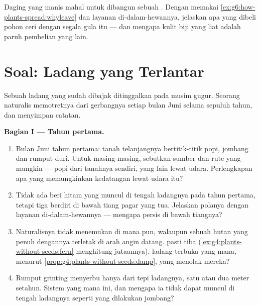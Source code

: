 \begin{exercise}[$\star\star\star$]\label{exo:g6:how-plants-spread:12}
Daging yang manis mahal untuk dibangun sebuah . Dengan memakai
\cref{ex:g6:how-plants-spread:whyleave} dan layanan di-dalam-hewannya,
jelaskan apa yang dibeli pohon ceri dengan segala gula itu --- dan
mengapa kulit biji yang liat adalah paruh pembelian yang lain.
\end{exercise}

\section{Soal: Ladang yang Terlantar}

\begin{problem}\label{pb:g6:how-plants-spread:1}
Sebuah ladang yang sudah dibajak ditinggalkan pada musim gugur. Seorang
naturalis memotretnya dari gerbangnya setiap bulan Juni selama sepuluh
tahun, dan menyimpan catatan.

\medskip\noindent\textbf{Bagian I --- Tahun pertama.}
\begin{enumerate}
  \item Bulan Juni tahun pertama: tanah telanjangnya bertitik-titik
         popi, jombang dan rumput duri. Untuk masing-masing,
        sebutkan sumber dan rute yang mungkin ---  popi dari
        tanahnya sendiri, yang lain lewat udara. Perlengkapan apa yang
        memungkinkan kedatangan lewat udara itu?
  \item Tidak ada beri hitam yang muncul di tengah ladangnya pada
        tahun pertama, tetapi tiga  berdiri di bawah tiang
        pagar yang tua. Jelaskan polanya dengan layanan
        di-dalam-hewannya --- mengapa persis di bawah tiangnya?
  \item Naturalisnya tidak menemukan  di mana pun,
        walaupun sebuah hutan yang penuh dengannya terletak di arah
        angin datang.   pasti tiba
        (\cref{ex:g4:plants-without-seeds:fern} menghitung jutaannya).
         ladang terbuka yang mana, menurut
        \cref{prop:g4:plants-without-seeds:damp}, yang menolak mereka?
  \item Rumput grinting menyerbu hanya dari tepi ladangnya, satu atau
        dua meter setahun. Sistem  yang mana ini, dan
        mengapa ia tidak dapat muncul di tengah ladangnya seperti yang
        dilakukan jombang?
\end{enumerate}


\end{problem}
